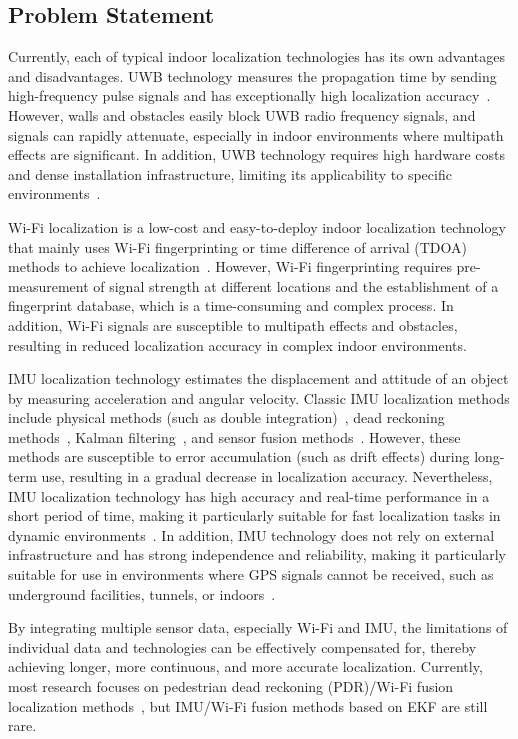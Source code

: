 \documentclass[12pt,a4paper]{article}
\numberwithin{equation}{section}
\begin{document}
\subsection{Problem Statement}
Currently, each of typical indoor localization technologies has its own
advantages and disadvantages. UWB technology measures the propagation time by
sending high-frequency pulse signals and has exceptionally high localization
accuracy~\cite{fontana2004recent}. However, walls and obstacles easily block UWB
radio frequency signals, and signals can rapidly attenuate, especially in indoor
environments where multipath effects are significant. In addition, UWB
technology requires high hardware costs and dense installation infrastructure,
limiting its applicability to specific environments~\cite{farahsari2022survey}.

Wi-Fi localization is a low-cost and easy-to-deploy indoor localization
technology that mainly uses Wi-Fi fingerprinting or time difference of arrival
(TDOA) methods to achieve
localization~\cite{yiu2017wireless,gustafsson2003positioning}. However, Wi-Fi
fingerprinting requires pre-measurement of signal strength at different
locations and the establishment of a fingerprint database, which is a
time-consuming and complex process. In addition, Wi-Fi signals are susceptible
to multipath effects and obstacles, resulting in reduced localization accuracy
in complex indoor environments.

IMU localization technology estimates the displacement and attitude of an object
by measuring acceleration and angular velocity. Classic IMU localization methods
include physical methods (such as double integration)~\cite{yan2018ridi}, dead
reckoning methods~\cite{jirawimut2003method}, Kalman
filtering~\cite{caron2006gps}, and sensor fusion
methods~\cite{dehzangi2017imu}. However, these methods are susceptible to error
accumulation (such as drift effects) during long-term use, resulting in a
gradual decrease in localization accuracy. Nevertheless, IMU localization
technology has high accuracy and real-time performance in a short period of
time, making it particularly suitable for fast localization tasks in dynamic
environments~\cite{marins2001improved}. In addition, IMU technology does not
rely on external infrastructure and has strong independence and reliability,
making it particularly suitable for use in environments where GPS signals cannot
be received, such as underground facilities, tunnels, or
indoors~\cite{wu2015indoor}.

By integrating multiple sensor data, especially Wi-Fi and IMU, the limitations
of individual data and technologies can be effectively compensated for, thereby
achieving longer, more continuous, and more accurate localization. Currently,
most research focuses on pedestrian dead reckoning (PDR)/Wi-Fi
 fusion localization
methods~\cite{liu2021kalman}, but IMU/Wi-Fi fusion methods based on EKF are
still rare.
\end{document}

